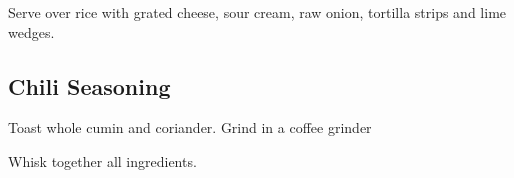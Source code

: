 \begin{recipe}
Serve over rice with grated cheese, sour cream, raw onion, tortilla strips and lime wedges.

\subsection{Chili Seasoning}



Toast whole cumin and coriander. Grind in a coffee grinder


Whisk together all ingredients.

\end{recipe}
